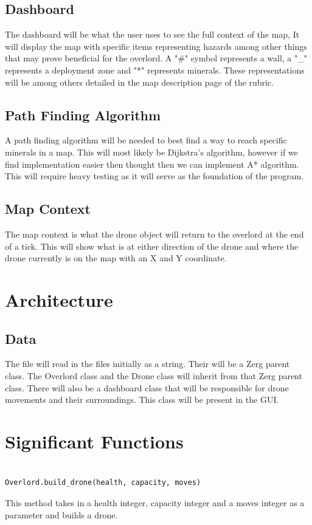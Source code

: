 \documentclass[12pt]{article}
\begin{document}
\subsection{Dashboard}
The dashboard will be what the user uses to see the full context of the map, It will display the map with specific items representing hazards among other things that may prove beneficial for the overlord. A "\#" symbol represents a wall, a "\_" represents a deployment zone and "*" represents minerals. These representations will be among others detailed in the map description page of the rubric.
\subsection{Path Finding Algorithm}
A path finding algorithm will be needed to best find a way to reach specific minerals in a map. This will most likely be Dijkstra's algorithm, however if we find implementation easier then thought then we can implement A* algorithm. This will require heavy testing as it will serve as the foundation of the program.
\subsection{Map Context}
The map context is what the drone object will return to the overlord at the end of a tick. This will show what is at either direction of the drone and where the drone currently is on the map with an X and Y coordinate.
\newpage
\section{Architecture}
\subsection{Data}
The file will read in the files initially as a string. Their will be a Zerg parent class. The Overlord class and the Drone class will inherit from that Zerg parent class. There will also be a dashboard class that will be responsible for drone movements and their surroundings. This class will be present in the GUI.
\section{Significant Functions}

\begin{lstlisting}[basicstyle=\large]

Overlord.build_drone(health, capacity, moves)
\end{lstlisting}
\large{This method takes in a health integer, capacity integer and a moves integer as a parameter and builds a drone.}\\
\end{document}
